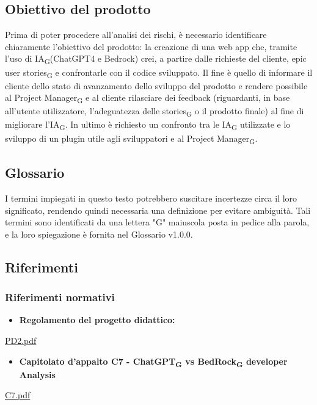 \documentclass{article}
\begin{document}
\subsection{Obiettivo del prodotto}
Prima di poter procedere all'analisi dei rischi, è necessario identificare chiaramente l'obiettivo del prodotto: la creazione di una web app che, tramite l’uso di IA\textsubscript{G}(ChatGPT4 e Bedrock) crei, a partire dalle richieste del cliente, epic user stories\textsubscript{G} e confrontarle con il codice sviluppato. Il fine è quello di informare il cliente dello stato di avanzamento dello sviluppo del prodotto e rendere possibile al Project Manager\textsubscript{G} e al cliente rilasciare dei
feedback (riguardanti, in base all'utente utilizzatore, l'adeguatezza delle stories\textsubscript{G} o il prodotto finale) al fine di migliorare l’IA\textsubscript{G}. In ultimo è richiesto un confronto tra le IA\textsubscript{G} utilizzate e lo sviluppo di un plugin utile agli sviluppatori e al Project Manager\textsubscript{G}.

\subsection{Glossario}
I termini impiegati in questo testo potrebbero suscitare incertezze circa il loro significato, rendendo quindi necessaria una definizione per evitare ambiguità. Tali termini sono identificati da una lettera "G" maiuscola posta in pedice alla parola, e la loro spiegazione è fornita nel Glossario v1.0.0.

\subsection{Riferimenti}
\subsubsection{Riferimenti normativi}
\begin{itemize}
    \item \textbf{Regolamento del progetto didattico:}
\end{itemize}
\href{https://www.math.unipd.it/~tullio/IS-1/2023/Dispense/PD2.pdf}{PD2.pdf}
\begin{itemize}
    \item \textbf{Capitolato d'appalto C7 - ChatGPT\textsubscript{G} vs BedRock\textsubscript{G} developer Analysis}
\end{itemize}
\href{https://www.math.unipd.it/~tullio/IS-1/2023/Progetto/C7.pdf}{C7.pdf}
\end{document}
